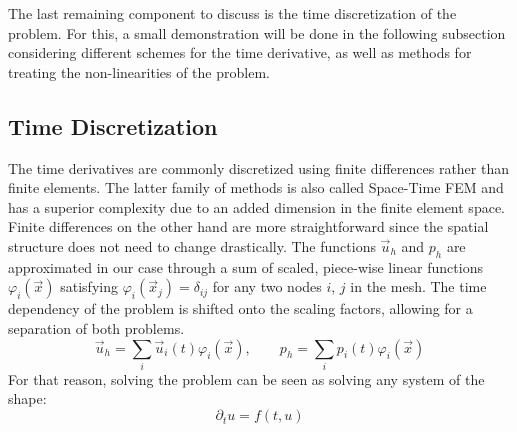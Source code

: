 The last remaining component to discuss is the time discretization of the problem. For this, a small demonstration will be done in the following subsection considering different schemes for the time derivative, as well as methods for treating the non-linearities of the problem.

\subsection{Time Discretization}
The time derivatives are commonly discretized using finite differences rather than finite elements. The latter family of methods is also called Space-Time FEM and has a superior complexity due to an added dimension in the finite element space. Finite differences on the other hand are more straightforward since the spatial structure does not need to change drastically. The functions $\vec{u}_h$ and $p_h$ are approximated in our case through a sum of scaled, piece-wise linear functions $\varphi_i(\vec{x})$ satisfying $\varphi_i(\vec{x}_j) = \delta_{ij}$ for any two nodes $i$, $j$ in the mesh. The time dependency of the problem is shifted onto the scaling factors, allowing for a separation of both problems.
\begin{equation*}
	\vec{u}_h = \sum_i \vec{u}_i(t) \varphi_i(\vec{x}),\qquad p_h = \sum_i p_i(t) \varphi_i(\vec{x})
\end{equation*}
For that reason, solving the problem can be seen as solving any system of the shape:
\begin{equation*}
	\partial_t u = f(t, u)
\end{equation*}

